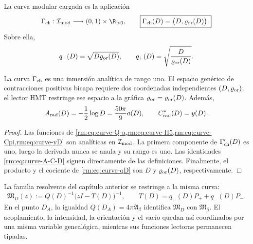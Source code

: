 \begin{definition}
\label{rm:def:charged-modular-curve}
La curva modular cargada es la aplicaci\'on
\begin{equation}
 \Gamma_{\rm ch}:\mathcal I_{\rm mod}\longrightarrow(0,1)\times\R_{>0},
 \qquad
 \boxed{\Gamma_{\rm ch}(D)=\bigl(D,\varrho_{\rm or}(D)\bigr).}
 \label{rm:eq:curve-Gamma}
\end{equation}
Sobre ella,
\begin{equation}
 q_-(D)=\sqrt{D\varrho_{\rm or}(D)},
 \qquad
 q_+(D)=\sqrt{\frac{D}{\varrho_{\rm or}(D)}}.
 \label{rm:eq:curve-qD}
\end{equation}
\end{definition}

\begin{theorem}
\label{rm:thm:curve-rank-one}
La curva \(\Gamma_{\rm ch}\) es una inmersi\'on anal\'itica de rango uno.
El espacio gen\'erico de contracciones positivas bicapa requiere dos
coordenadas independientes \((D,\varrho_{\rm or})\); el lector HMT restringe
ese espacio a la gr\'afica \(\varrho_{\rm or}=\varrho_{\rm or}(D)\).
Adem\'as,
\begin{equation}
 A_{\rm rad}(D)=-\frac12\log D
 =\frac{50\pi}{9}a(D),
 \qquad
 C^*_{\rm rad}(D)=y(D).
 \label{rm:eq:curve-A-C-D}
\end{equation}
\end{theorem}

\begin{proof}
Las funciones de \cref{rm:eq:curve-Q-a,rm:eq:curve-H5,rm:eq:curve-Cpi,rm:eq:curve-yD}
son anal\'iticas en \(\mathcal I_{\rm mod}\). La primera componente de
\(\Gamma_{\rm ch}'(D)\) es uno, luego la derivada nunca se anula y su rango
es uno. Las identidades \cref{rm:eq:curve-A-C-D} siguen directamente de las
definiciones. Finalmente, el producto y el cociente de
\cref{rm:eq:curve-qD} son \(D\) y \(\varrho_{\rm or}(D)\), respectivamente.
\end{proof}

La familia resolvente del cap\'itulo anterior se restringe a la misma curva:
\begin{equation}
 \mathfrak M_D(z)
 :=Q(D)^{-1}\bigl(zI-T(D)\bigr)^{-1},
 \qquad
 T(D)=q_+(D)P_++q_-(D)P_-.
 \label{rm:eq:curve-resolvent-D}
\end{equation}
En el punto \(D_A\), la igualdad \(Q(D_A)=4\pi\mathfrak A_\beta\)
identifica \(\mathfrak M_D\) con \(\mathfrak M_\beta\). El acoplamiento,
la intensidad, la orientaci\'on y el vac\'io quedan as\'i coordinados por una
misma variable geneal\'ogica, mientras sus funciones lectoras permanecen
tipadas.


